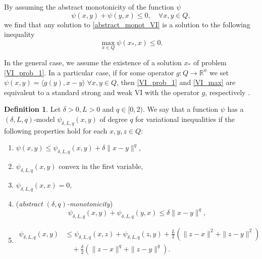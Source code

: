 \documentclass[11pt]{amsart}
\theoremstyle{definition}
\newtheorem{definition}[theorem]{Definition}
\numberwithin{equation}{section}
\begin{document}
By assuming the abstract monotonicity of the function $\psi$
\begin{equation}\label{abstract_monot_VI}
    \psi(x,y) + \psi(y, x) \leq 0, \quad \forall x, y \in Q,
\end{equation}
we find that any solution to \eqref{abstract_monot_VI} is a solution to the following inequality
\begin{equation}\label{VI_max}
    \max_{x \in Q} \psi (x_*, x) \leq 0. 
\end{equation}

In the general case, we assume the existence of a solution $x_*$ of problem \eqref{VI_prob_1}. In a particular case, if for some operator $g: Q \longrightarrow \mathbb{R}^n$ we set $\psi(x, y) = \langle g(y), x - y \rangle \; \forall x, y \in Q$, then \eqref{VI_prob_1} and \eqref{VI_max} are equivalent to a standard strong and weak VI with the operator $g$, respectively \cite{Stonyakin2021OMS}.

\begin{definition}\label{Def_Model_VI}
Let $\delta>0, L > 0$ and $q \in [0, 2)$. We say that a function $\psi$ has a $(\delta, L, q)$-model $\psi_{\delta, L,q} (x, y)$ of degree $q$ for variational inequalities if the following properties hold for each $x, y, z \in Q$:
\begin{enumerate}
    \item[(i)] $\psi(x, y) \leq \psi_{\delta, L, q}(x, y) + \delta \|x-y\|^q$,
    \item[(ii)] $\psi_{\delta, L, q} (x, y)$ convex in the first variable,
    \item[(iii)] $\psi_{\delta, L, q}(x,x)=0$,
    \item[(iv)] ({\it abstract $(\delta, q)$-monotonicity})
    \begin{equation}\label{eq:abstr_monot_delta}
        \psi_{\delta, L, q}(x,y)+\psi_{\delta, L, q}(y,x)\leq \delta \|x- y \|^q,
    \end{equation}
    \item[(v)] %
    \begin{align}\label{VIeq20}
        \psi_{\delta, L, q}(x,y)  & \leq \psi_{\delta, L, q}(x,z)+\psi_{\delta, L, q}(z,y)+ \frac{L}{2}\left(\|z - x\|^2 + \|z- y \|^2 \right) 
        \\& \quad + \frac{\delta}{2} \left(\|z - x\|^q + \|z- y \|^q\right). \nonumber
    \end{align}
\end{enumerate}
\end{definition}
\end{document}
